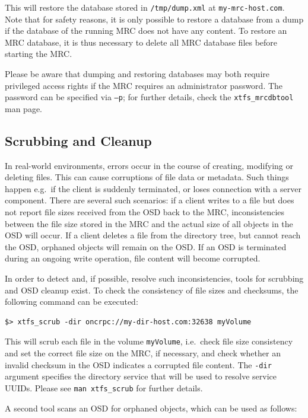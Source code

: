 \documentclass[a4paper,10pt]{book}
\begin{document}
This will restore the database stored in \texttt{/tmp/dump.xml} at \texttt{my-mrc-host.com}. Note that for safety reasons, it is only possible to restore a database from a dump if the database of the running MRC does not have any content. To restore an MRC database, it is thus necessary to delete all MRC database files before starting the MRC.

Please be aware that dumping and restoring databases may both require privileged access rights if the MRC requires an administrator password. The password can be specified via \texttt{--p}; for further details, check the \texttt{xtfs\_mrcdbtool} man page.

\subsection{Scrubbing and Cleanup}

In real-world environments, errors occur in the course of creating, modifying or deleting files. This can cause corruptions of file data or metadata. Such things happen e.g.\ if the client is suddenly terminated, or loses connection with a server component. There are several such scenarios: if a client writes to a file but does not report file sizes received from the OSD back to the MRC, inconsistencies between the file size stored in the MRC and the actual size of all objects in the OSD will occur. If a client deletes a file from the directory tree, but cannot reach the OSD, orphaned objects will remain on the OSD. If an OSD is terminated during an ongoing write operation, file content will become corrupted.

In order to detect and, if possible, resolve such inconsistencies, tools for scrubbing and OSD cleanup exist. To check the consistency of file sizes and checksums, the following command can be executed:

\begin{verbatim}
$> xtfs_scrub -dir oncrpc://my-dir-host.com:32638 myVolume
\end{verbatim}

This will scrub each file in the volume \texttt{myVolume}, i.e.\ check file size consistency and set the correct file size on the MRC, if necessary, and check whether an invalid checksum in the OSD indicates a corrupted file content. The \texttt{-dir} argument specifies the directory service that will be used to resolve service UUIDs. Please see \texttt{man xtfs\_scrub} for further details.

A second tool scans an OSD for orphaned objects, which can be used as follows:
\end{document}
